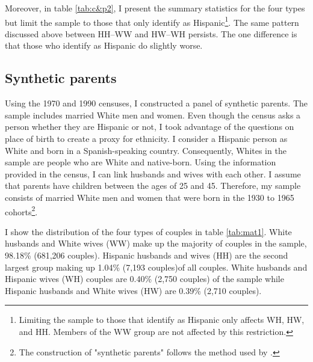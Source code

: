 \documentclass[12pt, fullpage]{article}
\begin{document}
Moreover, in table \ref{tab:c&p2}, I present the summary statistics for the four types but limit the sample to those that only identify as Hispanic\footnote{Limiting the sample to those that identify as Hispanic only affects WH, HW, and HH. Members of the WW group are not affected by this restriction.}. The same pattern discussed above between HH--WW and HW--WH persists. The one difference is that those who identify as Hispanic do slightly worse.
 
\subsection{Synthetic parents}

Using the 1970 and 1990 censuses, I constructed a panel of synthetic parents. The sample includes married White men and women. Even though the census asks a person whether they are Hispanic or not, I took advantage of the questions on place of birth to create a proxy for ethnicity. I consider a Hispanic person as White and born in a Spanish-speaking country. Consequently, Whites in the sample are people who are White and native-born. Using the information provided in the census, I can link husbands and wives with each other. I assume that parents have children between the ages of 25 and 45. Therefore, my sample consists of married White men and women that were born in the 1930 to 1965 cohorts\footnote{The construction of "synthetic parents" follows the method used by \citet{rubinstein2014pride}.}.

I show the distribution of the four types of couples in table \ref{tab:mat1}. White husbands and White wives (WW) make up the majority of couples in the sample, 98.18\% (681,206 couples). Hispanic husbands and wives (HH) are the second largest group making up 1.04\% (7,193 couples)of all couples. White husbands and Hispanic wives (WH) couples are 0.40\% (2,750 couples) of the sample while Hispanic husbands and White wives (HW) are 0.39\% (2,710 couples). 
\end{document}
